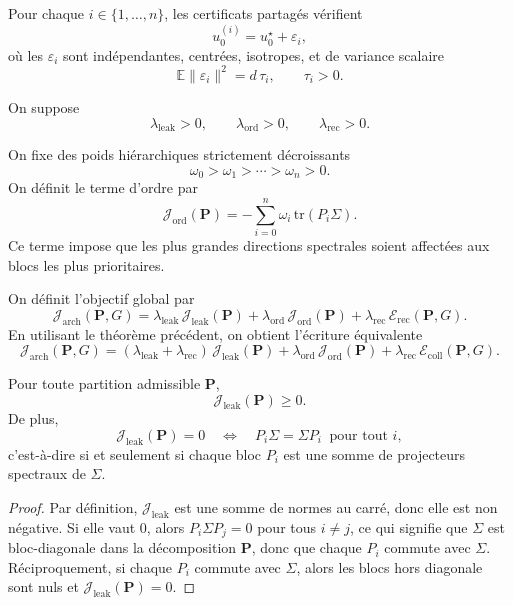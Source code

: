 \begin{assumption}
Pour chaque \(i\in\{1,\dots,n\}\), les certificats partagés vérifient
\[
u_0^{(i)}=u_0^\star+\varepsilon_i,
\]
où les \(\varepsilon_i\) sont indépendantes, centrées, isotropes, et de variance scalaire
\[
\mathbb E\|\varepsilon_i\|^2=d\,\tau_i,
\qquad \tau_i>0.
\]
\end{assumption}

\begin{assumption}
On suppose
\[
\lambda_{\mathrm{leak}}>0,
\qquad
\lambda_{\mathrm{ord}}>0,
\qquad
\lambda_{\mathrm{rec}}>0.
\]
\end{assumption}

\begin{definition}
On fixe des poids hiérarchiques strictement décroissants
\[
\omega_0>\omega_1>\cdots>\omega_n>0.
\]
On définit le terme d'ordre par
\[
\mathcal J_{\mathrm{ord}}(\mathbf P)
=
-\sum_{i=0}^n \omega_i\,\mathrm{tr}(P_i\Sigma).
\]
Ce terme impose que les plus grandes directions spectrales soient affectées aux blocs les plus prioritaires.
\end{definition}

\begin{definition}
On définit l'objectif global par
\[
\mathcal J_{\mathrm{arch}}(\mathbf P,G)
=
\lambda_{\mathrm{leak}}\,\mathcal J_{\mathrm{leak}}(\mathbf P)
+
\lambda_{\mathrm{ord}}\,\mathcal J_{\mathrm{ord}}(\mathbf P)
+
\lambda_{\mathrm{rec}}\,\mathcal E_{\mathrm{rec}}(\mathbf P,G).
\]
En utilisant le théorème précédent, on obtient l'écriture équivalente
\[
\mathcal J_{\mathrm{arch}}(\mathbf P,G)
=
(\lambda_{\mathrm{leak}}+\lambda_{\mathrm{rec}})\,
\mathcal J_{\mathrm{leak}}(\mathbf P)
+
\lambda_{\mathrm{ord}}\,\mathcal J_{\mathrm{ord}}(\mathbf P)
+
\lambda_{\mathrm{rec}}\,\mathcal E_{\mathrm{coll}}(\mathbf P,G).
\]
\end{definition}

\begin{lemma}
Pour toute partition admissible \(\mathbf P\),
\[
\mathcal J_{\mathrm{leak}}(\mathbf P)\ge 0.
\]
De plus,
\[
\mathcal J_{\mathrm{leak}}(\mathbf P)=0
\quad\Longleftrightarrow\quad
P_i\Sigma=\Sigma P_i
\ \text{ pour tout } i,
\]
c'est-à-dire si et seulement si chaque bloc \(P_i\) est une somme de projecteurs spectraux de \(\Sigma\).
\end{lemma}

\begin{proof}
Par définition, \(\mathcal J_{\mathrm{leak}}\) est une somme de normes au carré, donc elle est non négative.
Si elle vaut \(0\), alors \(P_i\Sigma P_j=0\) pour tous \(i\neq j\), ce qui signifie que \(\Sigma\) est bloc-diagonale dans la décomposition \(\mathbf P\), donc que chaque \(P_i\) commute avec \(\Sigma\).
Réciproquement, si chaque \(P_i\) commute avec \(\Sigma\), alors les blocs hors diagonale sont nuls et \(\mathcal J_{\mathrm{leak}}(\mathbf P)=0\).
\end{proof}

